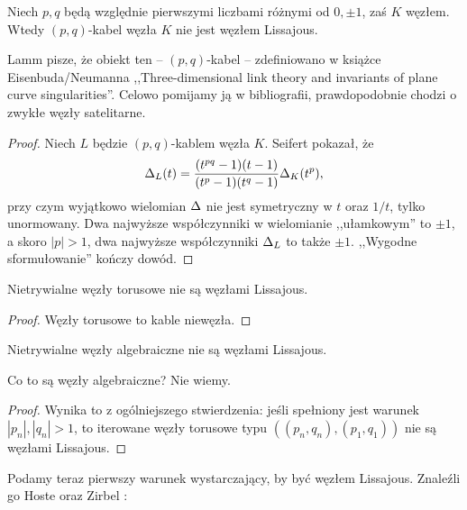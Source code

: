 \begin{proposition}
    Niech $p, q$ będą względnie pierwszymi liczbami różnymi od $0, \pm 1$, zaś $K$ węzłem.
    Wtedy $(p, q)$-kabel węzła $K$ nie jest węzłem Lissajous.
\end{proposition}

Lamm pisze, że obiekt ten -- $(p, q)$-kabel -- zdefiniowano w książce Eisenbuda/Neumanna ,,Three-dimensional link theory and invariants of plane curve singularities''.
%
%
Celowo pomijamy ją w bibliografii, prawdopodobnie chodzi o zwykłe węzły satelitarne.

\begin{proof}
%
    Niech $L$ będzie $(p, q)$-kablem węzła $K$.
    Seifert \cite{seifert1950} pokazał, że
    \begin{equation}
        \Delta_L(t) = \frac{(t^{pq}-1)(t-1)}{(t^p-1)(t^q-1)} \Delta_K(t^p),
    \end{equation}
    przy czym wyjątkowo wielomian $\Delta$ nie jest symetryczny w $t$ oraz $1/t$, tylko unormowany.
    Dwa najwyższe współczynniki w wielomianie ,,ułamkowym'' to $\pm 1$, a skoro $|p| > 1$, dwa najwyższe współczynniki $\Delta_L$ to także $\pm 1$.
    ,,Wygodne sformułowanie'' kończy dowód.
\end{proof}

\begin{corollary}
%
    Nietrywialne węzły torusowe nie są węzłami Lissajous.
\end{corollary}

\begin{proof}
    Węzły torusowe to kable niewęzła.
\end{proof}

\begin{corollary}
    Nietrywialne węzły algebraiczne nie są węzłami Lissajous.
\end{corollary}

Co to są węzły algebraiczne?
Nie wiemy.

\begin{proof}
    Wynika to z ogólniejszego stwierdzenia: jeśli spełniony jest warunek $|p_n|, |q_n| > 1$, to iterowane węzły torusowe typu $((p_n, q_n), (p_1, q_1))$ nie są węzłami Lissajous.
\end{proof}

Podamy teraz pierwszy warunek wystarczający, by być węzłem Lissajous.
Znaleźli go Hoste oraz Zirbel \cite{zirbel2006}:
%
%


